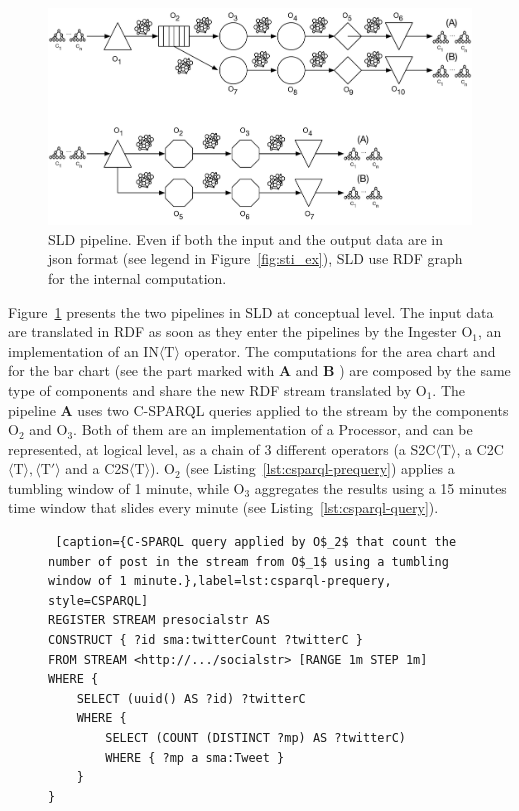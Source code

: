 \begin{figure}[t]
\centering
\includegraphics[width=\textwidth]{img/comp-mod-sld-pipeline}
\caption{SLD pipeline. Even if both the input and the output data are in json format (see legend in Figure~\ref{fig:sti_ex}), SLD use RDF graph for the internal computation.}
\label{fig:sld-pl}
\end{figure}

Figure~\ref{fig:sld-pl} presents the two pipelines in SLD at conceptual level.
The input data are translated in RDF as soon as they enter the pipelines by the \textsf{Ingester} O$_1$, an implementation of an IN$\langle\mathrm{T}\rangle$ operator. The computations for the area chart and for the bar chart (see the part marked with \textbf{A} and \textbf{B} ) are composed by the same type of components and share the new RDF stream translated by O$_1$.
The pipeline \textbf{A} uses two C-SPARQL queries applied to the stream by the components O$_2$ and O$_3$. Both of them are an implementation of a \textsf{Processor}, and can be represented, at logical level, as a chain of 3 different operators (a S2C$\langle\mathrm{T}\rangle$, a C2C$\langle\mathrm{T}\rangle,\langle\mathrm{T}\prime\rangle$ and a C2S$\langle\mathrm{T}\rangle$). 
O$_2$ (see Listing~\ref{lst:csparql-prequery}) applies a tumbling window of 1 minute, while O$_3$ aggregates the results using a 15 minutes time window that slides every minute (see Listing~\ref{lst:csparql-query}). 

\begin{figure}[ht]
\begin{minipage}{0.95\linewidth}
\begin{lstlisting} [caption={C-SPARQL query applied by O$_2$ that count the number of post in the stream from O$_1$ using a tumbling window of 1 minute.},label=lst:csparql-prequery, style=CSPARQL]
REGISTER STREAM presocialstr AS 
CONSTRUCT { ?id sma:twitterCount ?twitterC } 
FROM STREAM <http://.../socialstr> [RANGE 1m STEP 1m] 
WHERE { 
    SELECT (uuid() AS ?id) ?twitterC 
    WHERE { 
        SELECT (COUNT (DISTINCT ?mp) AS ?twitterC) 
        WHERE { ?mp a sma:Tweet } 
    } 
}
\end{lstlisting}
\end{minipage}
\end{figure}

